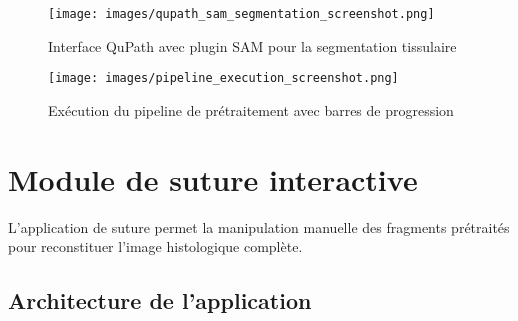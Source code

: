 \documentclass[11pt,a4paper]{report}
\begin{document}
\begin{figure}[htbp]
\centering
\texttt{[image: images/qupath\_sam\_segmentation\_screenshot.png]}
\caption{Interface QuPath avec plugin SAM pour la segmentation tissulaire}
\end{figure}

\begin{figure}[htbp]
\centering
\texttt{[image: images/pipeline\_execution\_screenshot.png]}
\caption{Exécution du pipeline de prétraitement avec barres de progression}
\end{figure}

\section{Module de suture interactive}

L'application de suture permet la manipulation manuelle des fragments prétraités pour reconstituer l'image histologique complète.

\subsection{Architecture de l'application}
\end{document}
